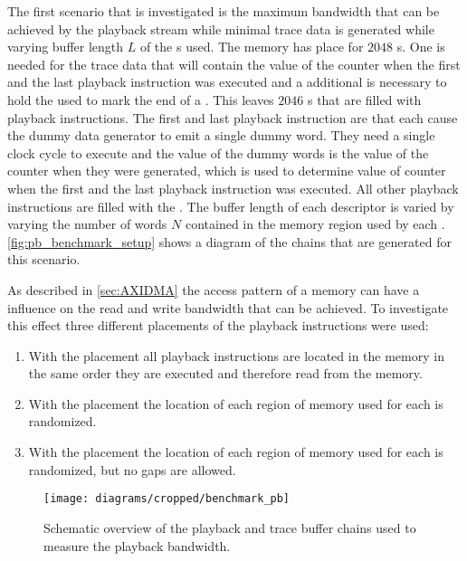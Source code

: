 The first scenario that is investigated is the maximum bandwidth that can be achieved by the playback stream while minimal trace data is generated while varying buffer length $L$ of the \descriptor{}s used. The \descriptor{} memory has place for $\num{2048}$ \descriptor{}s. One \descriptor{} is needed for the trace data that will contain the value of the \systime{} counter when the first and the last playback instruction was executed and a additional \descriptor{} is necessary to hold the \haltInstr{} used to mark the end of a \PlaybackProgram{}. This leaves $\num{2046}$ \descriptor{}s that are filled with playback instructions. The first and last playback instruction are \emitDummyInstr{} that each cause the dummy data generator to emit a single dummy word. They need a single clock cycle to execute and the value of the dummy words is the value of the \systime{} counter when they were generated, which is used to determine value of \systime{} counter when the first and the last playback instruction was executed. All other playback instructions are filled with the \resetSleepInstr{}. The buffer length of each descriptor is varied by varying the number of words $N$ contained in the memory region used by each \descriptor{}. \autoref{fig:pb_benchmark_setup} shows a diagram of the \descriptor{} chains that are generated for this scenario.

As described in \autoref{sec:AXIDMA} the access pattern of a \DDR{} memory can have a influence on the read and write bandwidth that can be achieved. To investigate this effect three different placements of the playback instructions were used:

\begin{enumerate}
    \item With the \linear{} placement all playback instructions are located in the \DDR{} memory in the same order they are executed and therefore read from the memory.
    \item With the \random{} placement the location of each region of memory used for each \descriptor{} is randomized.
    \item With the \randomDense{} placement the location of each region of memory used for each \descriptor{} is randomized, but no gaps are allowed.
\end{enumerate}

\begin{figure}[htbp]
\centerline{\texttt{[image: diagrams/cropped/benchmark\_pb]}}
\caption{Schematic overview of the playback and trace buffer chains used to measure the playback bandwidth.}\label{fig:pb_benchmark_setup}
\end{figure}

